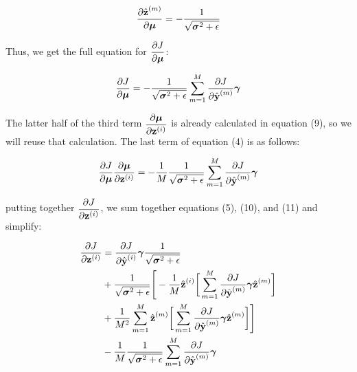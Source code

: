 \documentclass{article}
\begin{document}
\begin{multicols}{2}
\begin{equation}
    {\partial \hat{\textbf{z}}^{(m)} \over \partial \boldsymbol{\mu}} = 
    -{1 \over \sqrt{\boldsymbol{\sigma}^2 + \epsilon}} \notag
\end{equation}

Thus, we get the full equation for $\begin{aligned}
    {\partial J \over \partial \boldsymbol{\mu}}
\end{aligned}$:

\begin{equation}
    {\partial J \over \partial \boldsymbol{\mu}} = 
    -{1 \over \sqrt{\boldsymbol{\sigma}^2 + \epsilon}}
    \sum_{m=1}^M {\partial J \over \partial \hat{\textbf{y}}^{(m)}}
    \boldsymbol{\gamma} \notag
\end{equation}

The latter half of the third term $\begin{aligned}
    {\partial \boldsymbol{\mu}\over \partial \textbf{z}^{(i)}}
\end{aligned}$ is already calculated in equation (9), so we will reuse that
calculation. The last term of equation (4) is as follows:

\begin{equation}
    {\partial J \over \partial \boldsymbol{\mu}} 
    {\partial \boldsymbol{\mu} \over \partial \textbf{z}^{(i)}}
    =-{1\over M}{1 \over \sqrt{\boldsymbol{\sigma}^2 + \epsilon}}
    \sum_{m=1}^M {\partial J \over \partial \hat{\textbf{y}}^{(m)}}
    \boldsymbol{\gamma}
\end{equation}

putting together $\begin{aligned}
    {\partial J \over \partial \textbf{z}^{(i)}}
\end{aligned}$, we sum together equations (5), (10), and (11) and simplify:

\begin{equation}
    \begin{aligned}
        {\partial J \over \partial \textbf{z}^{(i)}}
        & = {\partial J \over \partial \hat{\textbf{y}}^{(i)}}
        \boldsymbol{\gamma} 
        {1 \over \sqrt{\boldsymbol{\sigma}^2 + \epsilon}} \\
        & + {1 \over \sqrt{\boldsymbol{\sigma}^2 + \epsilon}}\Bigg[-{1 \over M} \hat{\textbf{z}}^{(i)} \bigg[
            \sum_{m = 1}^M {\partial J \over \partial \hat{\textbf{y}}^{(m)}} 
            \boldsymbol{\gamma}
            \hat{\textbf{z}}^{(m)} \bigg]\\
        & +{1 \over M^2} \sum_{m=1}^M \hat{\textbf{z}}^{(m)}
            \bigg[
            \sum_{m = 1}^M {\partial J \over \partial \hat{\textbf{y}}^{(m)}} 
            \boldsymbol{\gamma}
            \hat{\textbf{z}}^{(m)}\bigg]\Bigg]\\
        & -{1\over M}{1 \over \sqrt{\boldsymbol{\sigma}^2 + \epsilon}}
        \sum_{m=1}^M {\partial J \over \partial \hat{\textbf{y}}^{(m)}}
        \boldsymbol{\gamma}\notag
    \end{aligned}
\end{equation}



\end{multicols}
\end{document}

